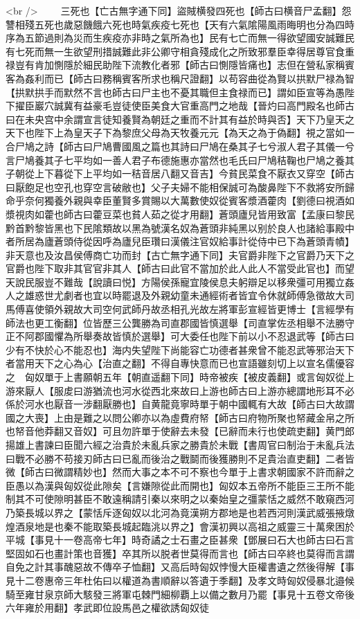 <br />
　　三死也【亡古無字通下同】盜賊横發四死也【師古曰横音尸孟翻】怨讐相殘五死也歲惡饑餓六死也時氣疾疫七死也【天有六氣隂陽風雨晦明也分為四時序為五節過則為災而生疾疫亦非時之氣所為也】民有七亡而無一得欲望國安誠難民有七死而無一生欲望刑措誠難此非公卿守相貪殘成化之所致邪羣臣幸得居尊官食重禄豈有肯加惻隱於細民助陛下流教化者邪【師古曰惻隱皆痛也】志但在營私家稱賓客為姦利而已【師古曰務稱賓客所求也稱尺證翻】以苟容曲從為賢以拱默尸禄為智【拱默拱手而默然不言也師古曰尸主也不憂其職但主食禄而已】謂如臣宣等為愚陛下擢臣巖穴誠冀有益豪毛豈徒使臣美食大官重高門之地哉【晉灼曰高門殿名也師古曰在未央宫中余謂宣言徒知養賢為朝廷之重而不計其有益於時與否】天下乃皇天之天下也陛下上為皇天子下為黎庶父母為天牧養元元【為天之為于偽翻】視之當如一合尸鳩之詩【師古曰尸鳩曹國風之篇也其詩曰尸鳩在桑其子七兮淑人君子其儀一兮言尸鳩養其子七平均如一善人君子布德施惠亦當然也毛氏曰尸鳩秸鞠也尸鳩之養其子朝從上下暮從下上平均如一秸音居八翻又音吉】今貧民菜食不厭衣又穿空【師古曰厭飽足也空孔也穿空言破敝也】父子夫婦不能相保誠可為酸鼻陛下不救將安所歸命乎奈何獨養外親與幸臣董賢多賞賜以大萬數使奴從賓客漿酒藿肉【劉德曰視酒如漿視肉如藿也師古曰藿豆菜也貧人茹之從才用翻】蒼頭廬兒皆用致富【孟康曰黎民黔首黔黎皆黑也下民隂類故以黑為號漢名奴為蒼頭非純黑以别於良人也諸給事殿中者所居為廬蒼頭侍從因呼為廬兒臣瓚曰漢儀注官奴給事計從侍中已下為蒼頭青幘】非天意也及汝昌侯傅商亡功而封【古亡無字通下同】夫官爵非陛下之官爵乃天下之官爵也陛下取非其官官非其人【師古曰此官不當加於此人此人不當受此官也】而望天說民服豈不難哉【說讀曰悦】方陽侯孫寵宜陵侯息夫躬辯足以移衆彊可用獨立姦人之雄惑世尤劇者也宜以時罷退及外親幼童未通經術者皆宜令休就師傅急徵故大司馬傅喜使領外親故大司空何武師丹故丞相孔光故左將軍彭宣經皆更博士【言經學有師法也更工衡翻】位皆歷三公龔勝為司直郡國皆慎選舉【司直掌佐丞相舉不法勝守正不阿郡國懼為所舉奏故皆慎於選舉】可大委任也陛下前以小不忍退武等【師古曰少有不快於心不能忍也】海内失望陛下尚能容亡功德者甚衆曾不能忍武等邪治天下者當用天下之心為心【治直之翻】不得自專快意而已也宣語雖刻切上以宣名儒優容之　匈奴單于上書願朝五年【朝直遥翻下同】時帝被疾【被皮義翻】或言匈奴從上游來厭人【服䖍曰游猶流也河水從西北來故曰上游也師古曰上游亦總謂地形耳不必係於河水也厭音一涉翻厭勝也】自黄龍竟寧時單于朝中國輒有大故【師古曰大故謂國之大喪】上由是難之以問公卿亦以為虛費府帑【師古曰府物所聚也帑藏金帛之所也帑音他莽翻又音奴】可且勿許單于使辭去未發【已辭而未行也使疏吏翻】黄門郎揚雄上書諫曰臣聞六經之治貴於未亂兵家之勝貴於未戰【書周官曰制治于未亂兵法曰戰不必勝不苟接刃師古曰已亂而後治之戰鬬而後獲勝則不足貴治直吏翻】二者皆微【師古曰微謂精妙也】然而大事之本不可不察也今單于上書求朝國家不許而辭之臣愚以為漢與匈奴從此隙矣【言嫌隙從此而開也】匈奴本五帝所不能臣三王所不能制其不可使隙明甚臣不敢遠稱請引秦以來明之以秦始皇之彊蒙恬之威然不敢窺西河乃築長城以界之【蒙恬斥逐匈奴以北河為竟漢朔方郡地是也若西河則漢武威張掖燉煌酒泉地是也秦不能取築長城起臨洮以界之】會漢初興以高祖之威靈三十萬衆困於平城【事見十一卷高帝七年】時奇譎之士石畫之臣甚衆【鄧展曰石大也師古曰石言堅固如石也畫計策也音獲】卒其所以脱者世莫得而言也【師古曰卒終也莫得而言謂自免之計其事醜惡故不傳卒子恤翻】又高后時匈奴悖慢大臣權書遺之然後得解【事見十二卷惠帝三年杜佑曰以權道為書順辭以答遺于季翻】及孝文時匈奴侵暴北邉候騎至雍甘泉京師大駭發三將軍屯棘門細柳覇上以備之數月乃罷【事見十五卷文帝後六年雍於用翻】孝武即位設馬邑之權欲誘匈奴徒